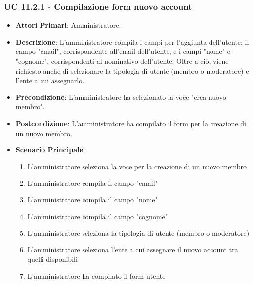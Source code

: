 			\subsubsection{UC 11.2.1 - Compilazione form nuovo account}
			\begin{itemize}
				\item \textbf{Attori Primari}: Amministratore.
				\item \textbf{Descrizione}: L'amministratore compila i campi per l'aggiunta dell'utente: il campo "email", corrispondente all'email dell'utente, e i campi "nome" e "cognome", corrispondenti al nominativo dell'utente. Oltre a ciò, viene richiesto anche di selezionare la tipologia di utente (membro o moderatore) e l'ente a cui assegnarlo.
				\item \textbf{Precondizione}: L'amministratore ha selezionato la voce "crea nuovo membro".
				\item \textbf{Postcondizione}: L'amministratore ha compilato il form per la creazione di un nuovo membro.
				\item \textbf{Scenario Principale}:
				\begin{enumerate}
					\item{L'amministratore seleziona la voce per la creazione di un nuovo membro}
					\item{L'amministratore compila il campo "email"}
					\item{L'amministratore compila il campo "nome"}
					\item{L'amministratore compila il campo "cognome"}
					\item{L'amministratore seleziona la tipologia di utente (membro o moderatore)}
					\item{L'amministratore seleziona l'ente a cui assegnare il nuovo account tra quelli disponibili}
					\item{L'amministratore ha compilato il form utente}
				\end{enumerate}	
			\end{itemize}

